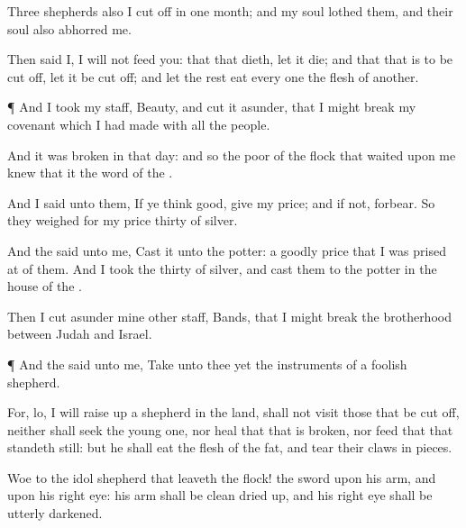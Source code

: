 {Three
shepherds also I cut
off in
one
month; and my
soul
lothed them, and their
soul also
abhorred me.

Then
said I, I will not
feed you: that that
dieth, let it
die; and that that is to be cut
off, let it be cut
off; and let the
rest
eat every
one the
flesh of
another.


\par }{\PP {}¶ And I
took my
staff,
{}
Beauty, and cut it
asunder, that I might
break my
covenant which I had
made with all the
people.

And it was
broken in that
day: and so the
poor of the
flock that
waited upon me
knew that it
{} the
word of the
{}.

And I
said unto them, If ye
think
good,
give
{} my
price; and if not,
forbear. So they
weighed for my
price
thirty
{} of
silver.

And the
{}
said unto me,
Cast it unto the
potter: a
goodly
price that I was prised
at of them. And I
took the
thirty
{} of
silver, and
cast them to the
potter in the
house of the
{}.

Then I cut
asunder mine
other
staff,
{}
Bands, that I might
break the
brotherhood between
Judah and
Israel.


\par }{\PP {}¶ And the
{}
said unto me,
Take unto thee yet the
instruments of a
foolish
shepherd.

For, lo, I will raise
up a
shepherd in the
land,
{} shall not
visit those that be cut
off, neither shall
seek the young
one, nor
heal that that is
broken, nor
feed that that
standeth still: but he shall
eat the
flesh of the
fat, and
tear their
claws in
pieces.

Woe to the
idol
shepherd that
leaveth the
flock! the
sword
{} upon his
arm, and upon his
right
eye: his
arm shall be
clean dried
up, and his
right
eye shall be
utterly
darkened.




}

